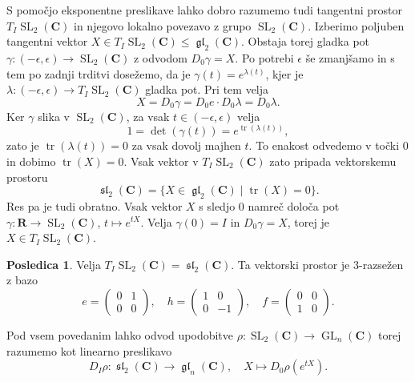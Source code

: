 \documentclass[11pt]{book}
\def\RR{\mathbf{R}}
\def\CC{\mathbf{C}}
\DeclareMathOperator\tr{tr}
\DeclareMathOperator\GL{GL}
\DeclareMathOperator\glfrak{\mathfrak{gl}}
\DeclareMathOperator\slfrak{\mathfrak{sl}}
\DeclareMathOperator\SL{SL}
\theoremstyle{definition}
\theoremstyle{zgled}
\theoremstyle{odprtproblem}
\theoremstyle{domacanaloga}
\theoremstyle{izrek}
\newtheorem*{posledica}{Posledica}
\begin{document}
S pomočjo eksponentne preslikave lahko dobro razumemo tudi tangentni prostor $T_I \SL_2(\CC)$ in njegovo lokalno povezavo z grupo $\SL_2(\CC)$. Izberimo poljuben tangentni vektor $X \in T_I \SL_2(\CC) \leq \glfrak_2(\CC)$. Obstaja torej gladka pot $\gamma \colon (-\epsilon, \epsilon) \to \SL_2(\CC)$ z odvodom $D_0 \gamma = X$. Po potrebi $\epsilon$ še zmanjšamo in s tem po zadnji trditvi dosežemo, da je $\gamma(t) = e^{\lambda(t)}$, kjer je $\lambda \colon (-\epsilon, \epsilon) \to T_I \SL_2(\CC)$ gladka pot. Pri tem velja
\[
    X = D_0 \gamma
    = D_0 e \cdot D_0 \lambda
    = D_0 \lambda.
\]
Ker $\gamma$ slika v $\SL_2(\CC)$, za vsak $t \in (- \epsilon, \epsilon)$ velja 
\[
    1 = \det (\gamma(t)) = e^{\tr(\lambda(t))},
\]
zato je $\tr(\lambda(t)) = 0$ za vsak dovolj majhen $t$. To enakost odvedemo v točki $0$ in dobimo $\tr(X) = 0$. Vsak vektor v $T_I \SL_2(\CC)$ zato pripada vektorskemu prostoru
\[
    \textstyle \slfrak_2(\CC) = \{ X \in \glfrak_2(\CC) \mid \tr(X) = 0 \}.
\]
Res pa je tudi obratno. Vsak vektor $X$ s sledjo $0$ namreč določa pot $\gamma \colon \RR \to \SL_2(\CC)$, $t \mapsto e^{tX}$. Velja $\gamma(0) = I$ in $D_0 \gamma = X$, torej je $X \in T_I \SL_2(\CC)$.

\begin{posledica}
Velja $T_I \SL_2(\CC) = \slfrak_2(\CC)$. Ta vektorski prostor je $3$-razsežen z bazo
\[
    e = \begin{pmatrix}
        0 & 1 \\ 0 & 0
    \end{pmatrix},
    \quad
    h = \begin{pmatrix}
        1 & 0 \\ 0 & -1
    \end{pmatrix},
    \quad
    f = \begin{pmatrix}
        0 & 0 \\ 1 & 0
    \end{pmatrix}.
\]
\end{posledica}

Pod vsem povedanim lahko odvod upodobitve $\rho \colon \SL_2(\CC) \to \GL_n(\CC)$ torej razumemo kot linearno preslikavo
\[
    {\textstyle D_I \rho \colon \slfrak_2(\CC) \to \glfrak_n(\CC),} \quad
    X \mapsto D_0 \rho(e^{tX}).
\]
\end{document}
